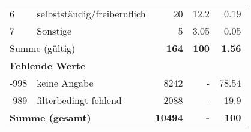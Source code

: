 \begin{longtable}{lXrrr}
     6 &
     \multicolumn{1}{X}{ selbstständig/freiberuflich   } &


       \num{20} &
       \num[round-mode=places,round-precision=2]{12,2} &
         \num[round-mode=places,round-precision=2]{0,19} \\

     7 &
     \multicolumn{1}{X}{ Sonstige   } &


       \num{5} &
       \num[round-mode=places,round-precision=2]{3,05} &
         \num[round-mode=places,round-precision=2]{0,05} \\
     \midrule
     \multicolumn{2}{l}{Summe (gültig)} &
       \textbf{\num{164}} &
     \textbf{100} &
       \textbf{\num[round-mode=places,round-precision=2]{1,56}} \\
     \multicolumn{5}{l}{\textbf{Fehlende Werte}}\\
       -998 &
       keine Angabe &
         \num{8242} &
        - &
         \num[round-mode=places,round-precision=2]{78,54} \\
       -989 &
       filterbedingt fehlend &
         \num{2088} &
        - &
         \num[round-mode=places,round-precision=2]{19,9} \\
     \midrule
     \multicolumn{2}{l}{\textbf{Summe (gesamt)}} &
          \textbf{\num{10494}} &
        \textbf{-} &
        \textbf{100} \\
     \bottomrule
     \end{longtable}
     
